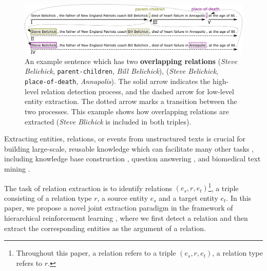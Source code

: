 \documentclass[letterpaper]{article} %
\theoremstyle{definition}
\begin{document}
\begin{figure}[!tp]
    \centering
    \includegraphics[width=\linewidth]{example.png}
    \caption{An example sentence which has two {\bf overlapping relations} (\textit{Steve Belichick}, \texttt{parent-children}, \textit{Bill Belichick}), (\textit{Steve Belichick}, \texttt{place-of-death}, \textit{Annapolis}). The solid arrow indicates the high-level relation detection process, and the dashed arrow for low-level entity extraction. The dotted arrow marks a transition between the two processes. This example shows how overlapping relations are extracted (\textit{Steve Blichick} is included in both triples).}
    \label{Example}
\end{figure}

Extracting entities, relations, or events from unstructured texts is crucial for building large-scale, reusable knowledge which can facilitate many other tasks \cite{mintz2009distant,nadeau2007survey}, including knowledge base construction \cite{dong2014knowledge,luan2018multi}, question answering \cite{fader2014open}, and biomedical text mining \cite{huang2015community}.

%

The task of relation extraction is to identify relations $(e_s, r, e_t)$\footnote{Throughout this paper, a relation refers to a triple $(e_s, r, e_t)$, a relation type refers to $r$.}, a triple consisting of a relation type $r$, a source entity $e_s$ and a target entity $e_t$. In this paper, we propose a novel joint extraction paradigm in the framework of hierarchical reinforcement learning \cite{sutton1999between}, where we first detect a relation and then extract the corresponding entities as the argument of a relation.
\end{document}
